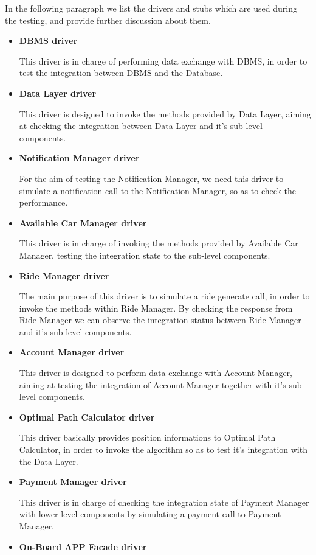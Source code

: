 \documentclass[a4paper,11pt]{article}
\begin{document}
In the following paragraph we list the drivers and stubs which are used during the testing, and provide further discussion about them.
	\begin{itemize}
	\item \textbf{DBMS driver}
	
	This driver is in charge of performing data exchange with DBMS, in order to test the integration between DBMS and the Database.
	\item \textbf{Data Layer driver}
	
	This driver is designed to invoke the methods provided by Data Layer, aiming at checking the integration between Data Layer and it's sub-level components.
	\item \textbf{Notification Manager driver}
	
	For the aim of testing the Notification Manager, we need this driver to simulate a notification call to the Notification Manager, so as to check the performance.
	\item \textbf{Available Car Manager driver}
	
	This driver is in charge of invoking the methods provided by Available Car Manager, testing the integration state to the sub-level components.
	\item \textbf{Ride Manager driver}
	
	The main purpose of this driver is to simulate a ride generate call, in order to invoke the methods within Ride Manager. By checking the response from Ride Manager we can observe the integration status between Ride Manager and it's sub-level components.
	\item \textbf{Account Manager driver}
	
	This driver is designed to perform data exchange with Account Manager, aiming at testing the integration of Account Manager together with it's sub-level components.
	\item \textbf{Optimal Path Calculator driver}
	
	This driver basically provides position informations to Optimal Path Calculator, in order to invoke the algorithm so as to test it's integration with the Data Layer.
	\item \textbf{Payment Manager driver}
	
	This driver is in charge of checking the integration state of Payment Manager with lower level components by simulating a payment call to Payment Manager.
	\item \textbf{On-Board APP Facade driver}
	

\end{itemize}
\end{document}
